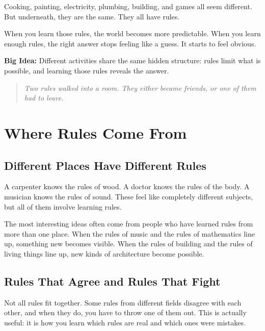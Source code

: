 \documentclass[12pt]{book}
\begin{document}
Cooking, painting, electricity, plumbing, building, and games all seem
different. But underneath, they are the same. They all have rules.

When you learn those rules, the world becomes more predictable. When you
learn enough rules, the right answer stops feeling like a guess. It starts
to feel obvious.

\textbf{Big Idea:} Different activities share the same hidden structure:
rules limit what is possible, and learning those rules reveals the answer.

\begin{quote}\itshape
Two rules walked into a room.
They either became friends, or one of them had to leave.
\end{quote}

\chapter{Where Rules Come From}

\section{Different Places Have Different Rules}

A carpenter knows the rules of wood. A doctor knows the rules of the body.
A musician knows the rules of sound. These feel like completely different
subjects, but all of them involve learning rules.

The most interesting ideas often come from people who have learned rules
from more than one place. When the rules of music and the rules of
mathematics line up, something new becomes visible. When the rules of
building and the rules of living things line up, new kinds of architecture
become possible.

\section{Rules That Agree and Rules That Fight}

Not all rules fit together. Some rules from different fields disagree with
each other, and when they do, you have to throw one of them out. This is
actually useful: it is how you learn which rules are real and which ones
were mistakes.
\end{document}
